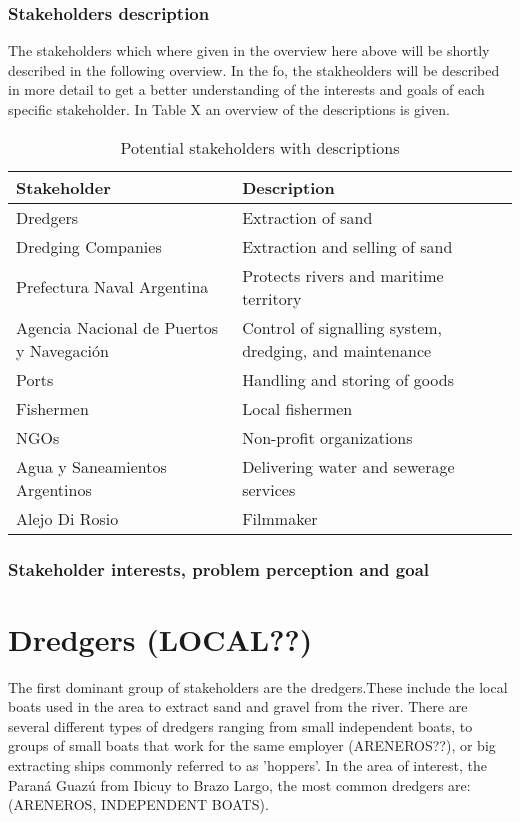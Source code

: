 \subsubsection{Stakeholders description}

The stakeholders which where given in the overview here above will be shortly described in the following overview. In the fo, the stakheolders will be described in more detail to get a better understanding of the interests and goals of each specific stakeholder. In Table X an overview of the descriptions is given.

\begin{table}[ht]
\centering
\begin{tabularx}{\linewidth}{lX}
\toprule
\textbf{Stakeholder} & \textbf{Description} \\
\midrule
Dredgers & Extraction of sand \\
\midrule
Dredging Companies & Extraction and selling of sand \\
\midrule
Prefectura Naval Argentina & Protects rivers and maritime territory \\
\midrule
Agencia Nacional de Puertos y Navegación & Control of signalling system, dredging, and maintenance \\
\midrule
Ports & Handling and storing of goods \\
\midrule
Fishermen & Local fishermen \\
\midrule
NGOs & Non-profit organizations \\
\midrule
Agua y Saneamientos Argentinos & Delivering water and sewerage services \\
\midrule
Alejo Di Rosio & Filmmaker \\
\bottomrule
\end{tabularx}
\caption{Potential stakeholders with descriptions}
\label{tab:stakeholders-description}
\end{table}




\subsubsection{Stakeholder interests, problem perception and goal}



\section{Dredgers (LOCAL??)}
The first dominant group of stakeholders are the dredgers.These include the local boats used in the area to extract sand and gravel from the river. There are several different types of dredgers ranging from small independent boats, to groups of small boats that work for the same employer (ARENEROS??), or big extracting ships commonly referred to as 'hoppers'. In the area of interest, the Paraná Guazú from Ibicuy to Brazo Largo, the most common dredgers are: (ARENEROS, INDEPENDENT BOATS). 

